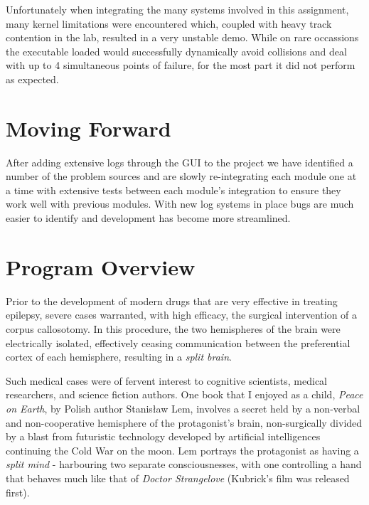 \documentclass{amsart} \usepackage{amsmath} \usepackage{upgreek}
\begin{document}
Unfortunately when integrating the many systems involved in this assignment,
many kernel limitations were encountered which, coupled with heavy track
contention in the lab, resulted in a very unstable demo. While on rare
occassions the executable loaded would successfully dynamically avoid collisions
and deal with up to 4 simultaneous points of failure, for the most part it did
not perform as expected.

\section*{Moving Forward}

After adding extensive logs through the GUI to the project we have identified a
number of the problem sources and are slowly re-integrating each module one at a
time with extensive tests between each module's integration to ensure they work
well with previous modules. With new log systems in place bugs are much easier
to identify and development has become more streamlined.

\clearpage

\section*{Program Overview}

Prior to the development of modern drugs that are very effective in treating
epilepsy, severe cases warranted, with high efficacy, the surgical intervention
of a corpus callosotomy. In this procedure, the two hemispheres of the brain
were electrically isolated, effectively ceasing communication between the
preferential cortex of each hemisphere, resulting in a \textit{split brain}.

Such medical cases were of fervent interest to cognitive scientists, medical
researchers, and science fiction authors. One book that I enjoyed as a child,
\textit{Peace on Earth}, by Polish author Stanis\l{}aw Lem, involves a secret
held by a non-verbal and non-cooperative hemisphere of the protagonist's brain,
non-surgically divided by a blast from futuristic technology developed by
artificial intelligences continuing the Cold War on the moon. Lem portrays the
protagonist as having a \textit{split mind} - harbouring two separate
consciousnesses, with one controlling a hand that behaves much like that of
\textit{Doctor Strangelove} (Kubrick's film was released first).
\end{document}
